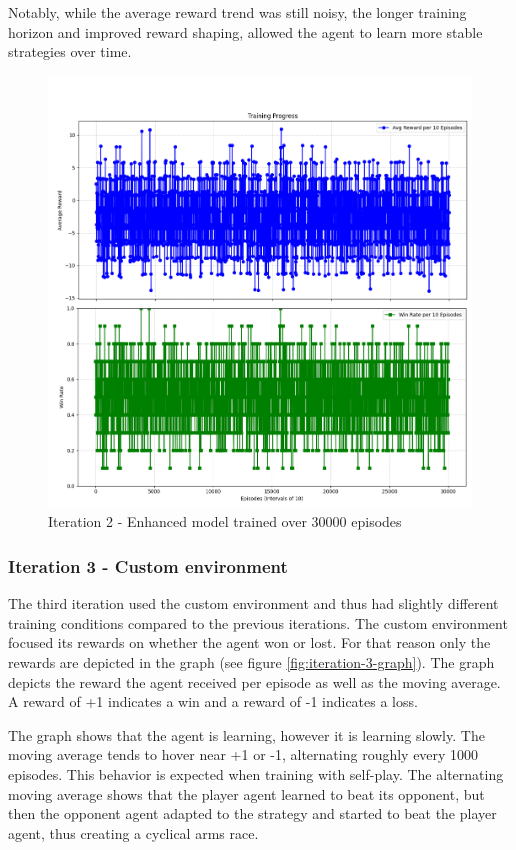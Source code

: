 Notably, while the average reward trend was still noisy, the longer training horizon
and improved reward shaping, allowed the agent to learn more stable strategies over time.

\begin{figure}[H]
    \centering
    \includegraphics[width=\textwidth]{assets/Iteration-2-graphs.png}
    \caption{Iteration 2 - Enhanced model trained over 30000 episodes}
    \label{fig:iteration-2-graphs}
\end{figure}

\subsubsection{Iteration 3 - Custom environment}
The third iteration used the custom environment and thus had slightly different training conditions compared to the previous iterations.
The custom environment focused its rewards on whether the agent won or lost. For that reason only the rewards are depicted in the graph (see figure \ref{fig:iteration-3-graph}).
The graph depicts the reward the agent received per episode as well as the moving average. A reward of +1 indicates a win and a reward of -1 indicates a loss.

The graph shows that the agent is learning, however it is learning slowly. The moving average tends to hover near +1 or -1, alternating roughly every 1000 episodes.
This behavior is expected when training with self-play. The alternating moving average shows that the player agent learned to beat its opponent, but then the opponent 
agent adapted to the strategy and started to beat the player agent, thus creating a cyclical arms race. 

